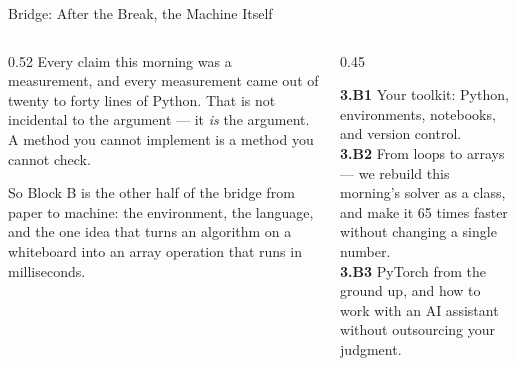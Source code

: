\begin{frame}{Bridge: After the Break, the Machine Itself}
\begin{columns}[T]
\begin{column}{0.52\textwidth}
\small
Every claim this morning was a measurement, and every measurement came out of twenty to forty lines of Python. That is not incidental to the argument --- it \emph{is} the argument. A method you cannot implement is a method you cannot check.
\medskip

So Block B is the other half of the bridge from paper to machine: the environment, the language, and the one idea that turns an algorithm on a whiteboard into an array operation that runs in milliseconds.
\end{column}
\begin{column}{0.45\textwidth}
\begin{conceptbox}[title=\textbf{After the break (Block B)}]\small
\textbf{3.B1} Your toolkit: Python, environments, notebooks, and version control.\\[1mm]
\textbf{3.B2} From loops to arrays --- we rebuild this morning's solver as a class, and make it 65 times faster without changing a single number.\\[1mm]
\textbf{3.B3} PyTorch from the ground up, and how to work with an AI assistant without outsourcing your judgment.
\end{conceptbox}
\end{column}
\end{columns}
\end{frame}



